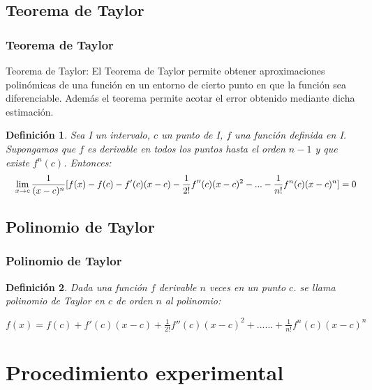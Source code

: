 \documentclass{beamer}
\newtheorem{definicion}{Definición}
\begin{document}
\subsection{Teorema de Taylor}

\begin{frame}
\frametitle{Teorema de Taylor}

\begin{block}{Teorema de Taylor:}
El Teorema de Taylor permite obtener aproximaciones polinómicas de una función en un entorno de cierto punto en que la función sea diferenciable. 
Además el teorema permite acotar el error obtenido mediante dicha estimación. 
\end{block}
\begin{definicion}
Sea I un intervalo, $c$ un punto de I, $f$ una función definida en I. Supongamos que $f$ es derivable en todos los puntos hasta el orden
$n-1$ y que existe $f ^ n (c)$. Entonces:
\tiny{
\[\quad \lim_{x\to c} \frac{1}{(x-c)^n} [ f(x) - f(c) - f '(c) (x-c) - \frac{1}{2!} f '' (c) (x-c) ^ 2 - ...- \frac{1}{n!} f ^ n(c) (x-c) ^ n ] = \text 0\]
}
\end{definicion}

\end{frame}


\subsection{Polinomio de Taylor}

\begin{frame}
\frametitle{Polinomio de Taylor}
\begin{definicion}
Dada una función $f$ derivable $n$ veces en un punto $c$. se llama polinomio de Taylor en $c$ de orden $n$ al
polinomio:
\end{definicion}
\begin{block}{ }
	    $f(x) = f(c) + f '(c) (x-c) + \frac{1}{2!} f '' (c) (x-c) ^ 2 + ...... + \frac{1}{n!} f ^ n(c) (x-c) ^ n$
\end{block}
\end{frame}

\section{Procedimiento experimental}
\end{document}
